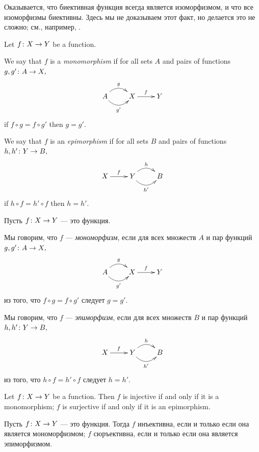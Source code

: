 \documentclass[CT4S-EN-RU]{subfiles}
\begin{document}
\begin{remarkRUS}
Оказывается, что биективная функция всегда является изоморфизмом, и что все изоморфизмы биективны. Здесь мы не доказываем этот факт, но делается это не сложно; см., например, \cite[Theorem 5.4]{Big}.
\end{remarkRUS}

\begin{definitionENG}\label{def:mono, epi in set}
Let $f\colon X\rightarrow Y$ be a function. 

We say that $f$ is a {\em monomorphism} if for all sets $A$ and pairs of functions $g,g'\colon A\rightarrow X,$
$$
\xymatrix{A\ar@/^1pc/[r]^g\ar@/_1pc/[r]_{g'}&X\ar[r]^f&Y}
$$
if $f\circ g=f\circ g'$ then $g=g'.$

We say that $f$ is an {\em epimorphism} if for all sets $B$ and pairs of functions $h,h'\colon Y\rightarrow B,$ 
$$
\xymatrix{X\ar[r]^f&Y\ar@/^1pc/[r]^h\ar@/_1pc/[r]_{h'}&B}
$$
if $h\circ f=h'\circ f$ then $h=h'.$
\end{definitionENG}

\begin{definitionRUS}\label{def:mono, epi in set}
Пусть $f\colon X\rightarrow Y$ — это функция. 

Мы говорим, что $f$ — {\em мономорфизм}, если для всех множеств $A$ и пар функций $g,g'\colon A\rightarrow X,$
$$
\xymatrix{A\ar@/^1pc/[r]^g\ar@/_1pc/[r]_{g'}&X\ar[r]^f&Y}
$$
из того, что $f\circ g=f\circ g'$ следует $g=g'.$

Мы говорим, что $f$ — {\em эпиморфизм}, если для всех множеств $B$ и пар функций $h,h'\colon Y\rightarrow B,$ 
$$
\xymatrix{X\ar[r]^f&Y\ar@/^1pc/[r]^h\ar@/_1pc/[r]_{h'}&B}
$$
из того, что $h\circ f=h'\circ f$ следует $h=h'.$
\end{definitionRUS}

\begin{propositionENG}\label{prop:inj and surj}
Let $f\colon X\rightarrow Y$ be a function. Then $f$ is injective if and only if it is a monomorphism; $f$ is surjective if and only if it is an epimorphism.
\end{propositionENG}

\begin{propositionRUS}\label{prop:inj and surj}
Пусть $f\colon X\rightarrow Y$ — это функция. Тогда $f$ инъективна, если и только если она является мономорфизмом; $f$ сюръективна, если и только если она является эпиморфизмом.
\end{propositionRUS}
\end{document}
